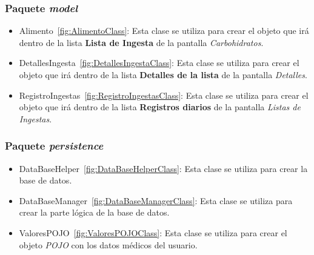 \subsubsection{Paquete \textit{model}}
\begin{itemize}
	\item Alimento~\ref{fig:AlimentoClass}: Esta clase se utiliza para crear el objeto que irá dentro de la lista \textbf{Lista de Ingesta} de la pantalla \textit{Carbohidratos}.
	\item DetallesIngesta~\ref{fig:DetallesIngestaClass}: Esta clase se utiliza para crear el objeto que irá dentro de la lista \textbf{Detalles de la lista} de la pantalla \textit{Detalles}.
	\item RegistroIngestas~\ref{fig:RegistroIngestasClass}: Esta clase se utiliza para crear el objeto que irá dentro de la lista \textbf{Registros diarios} de la pantalla \textit{Listas de Ingestas}.
\end{itemize}
\subsubsection{Paquete \textit{persistence}}
\begin{itemize}
	\item DataBaseHelper~\ref{fig:DataBaseHelperClass}: Esta clase se utiliza para crear la base de datos.
	\item DataBaseManager~\ref{fig:DataBaseManagerClass}: Esta clase se utiliza para crear la parte lógica de la base de datos.
	\item ValoresPOJO~\ref{fig:ValoresPOJOClass}: Esta clase se utiliza para crear el objeto \textit{POJO} con los datos médicos del usuario.
\end{itemize}
